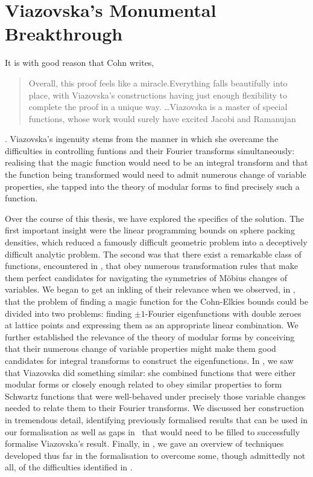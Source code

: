\section{Viazovska's Monumental Breakthrough}

It is with good reason that Cohn writes,
\begin{quote}
    Overall, this proof feels like a miracle.Everything falls beautifully into place, with Viazovska’s constructions having just enough flexibility to complete the proof in a unique way. \ldots Viazovska is a master of special functions, whose work would surely have excited Jacobi and Ramanujan
\end{quote}
\cite[p.21]{CohnOnViazovskaICM}. Viazovska's ingenuity stems from the manner in which she overcame the difficulties in controlling funtions and their Fourier transforms simultaneously: realising that the magic function would need to be an integral transform and that the function being transformed would need to admit numerous change of variable properties, she tapped into the theory of modular forms to find precisely such a function.

Over the course of this thesis, we have explored the specifics of the solution. The first important insight were the linear programming bounds on sphere packing densities, which reduced a famously difficult geometric problem into a deceptively difficult analytic problem. The second was that there exist a remarkable class of functions, encountered in , that obey numerous transformation rules that make them perfect candidates for navigating the symmetries of Möbius changes of variables. We began to get an inkling of their relevance when we observed, in , that the problem of finding a magic function for the Cohn-Elkies bounds could be divided into two problems: finding $\pm 1$-Fourier eigenfunctions with double zeroes at lattice points and expressing them as an appropriate linear combination. We further established the relevance of the theory of modular forms by conceiving that their numerous change of variable properties might make them good candidates for integral transforms to construct the eigenfunctions. In , we saw that Viazovska did something similar: she combined functions that were either modular forms or closely enough related to obey similar properties to form Schwartz functions that were well-behaved under precisely those variable changes needed to relate them to their Fourier transforms. We discussed her construction in tremendous detail, identifying previously formalised results that can be used in our formalisation as well as gaps in \mathlib\ that would need to be filled to successfully formalise Viazovska's result. Finally, in , we gave an overview of techniques developed thus far in the formalisation to overcome some, though admittedly not all, of the difficulties identified in .

